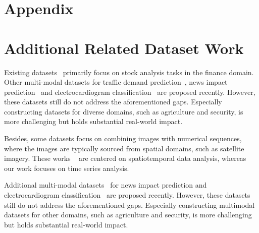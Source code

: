\newpage
\section*{Appendix}

\section{Additional Related Dataset Work}\label{app:related}
Existing datasets~\cite{atzeni2017fine,xu2018stock,rodrigues2019combining,farimani2021leveraging,sinha2022sentfin,dong2024fnspid,cao2023tempo} primarily focus on stock analysis tasks in the finance domain. Other multi-modal datasets for traffic demand prediction~\cite{rodrigues2019combining}, news impact prediction~\cite{jia2024gpt4mts} and electrocardiogram classification~\cite{li2024frozen} are proposed recently. However, these datasets still do not address the aforementioned gaps. Especially constructing datasets for diverse domains, such as agriculture and security, is more challenging but holds substantial real-world impact.


Besides, some datasets focus on combining images with numerical sequences, where the images are typically
sourced from spatial domains, such as satellite imagery. These works ~\cite{gerard2023wildfirespreadts,liu2012spatial} are centered on spatiotemporal data
analysis, whereas our work focuses on time series analysis.

Additional multi-modal datasets~\cite{jia2024gpt4mts} for news impact prediction and electrocardiogram classification~\cite{li2024frozen} are proposed recently. However, these datasets still do not address the aforementioned gaps. Especially constructing multimodal datasets for other domains, such as agriculture and security, is more challenging but holds substantial real-world impact.
